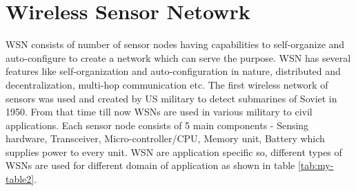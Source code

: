 \section{Wireless Sensor Netowrk}
WSN consists of number of sensor nodes having capabilities to self-organize and auto-configure to create a network which can serve the purpose. WSN has several features like self-organization and auto-configuration in nature, distributed and decentralization, multi-hop communication etc. The first wireless network of sensors was used and created by US military to detect submarines of Soviet in 1950. From that time till now WSNs are used in various military to civil applications. Each sensor node consists of 5 main components - Sensing hardware, Transceiver, Micro-controller/CPU, Memory unit, Battery which supplies power to every unit. WSN are application specific so, different types of WSNs are used for different domain of application \cite{articleTypesWSN} as shown in table \ref{tab:my-table2}.
\begin{table}[htp]
\centering
\caption{Types of WSN}
\label{tab:my-table2}
\end{table}

